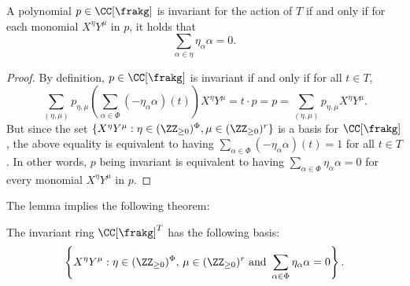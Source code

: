 \begin{lemma}
A polynomial $p \in \CC[\frakg]$ is invariant for the action of $T$ if and only if for each monomial $X^\eta Y^\mu$ in $p$, it holds that
$$\sum_{\alpha\in\eta} \eta_\alpha \alpha = 0.$$
\end{lemma}
\begin{proof}
    By definition, $p \in \CC[\frakg]$ is invariant if and only if for all $t \in T$,
    $$ \sum_{(\eta, \mu)} p_{\eta,\mu} \left(\sum_{\alpha\in\Phi} (- \eta_\alpha \alpha)(t)\right) X^\eta Y^\mu =t\cdot p = p = \sum_{(\eta, \mu)} p_{\eta,\mu} X^\eta Y^\mu.$$
    But since the set $\{X^\eta Y^\mu : \eta \in (\ZZ_{\ge 0})^\Phi, \mu \in (\ZZ_{\ge 0})^r\}$ is a basis for $\CC[\frakg]$, the above equality is equivalent to having 
    $\sum_{\alpha\in\Phi} (- \eta_\alpha \alpha)(t) = 1$ for all $t \in T$. In other words, $p$ being invariant is equivalent to having $\sum_{\alpha\in\Phi} \eta_\alpha \alpha = 0$
    for every monomial $X^\eta Y^\mu$ in $p$.
\end{proof}

The lemma implies the following theorem:

\begin{theorem}\label{invringbasis}
    The invariant ring $\CC[\frakg]^T$ has the following basis:
    $$\left\{ X^\eta Y^\mu :\eta \in (\ZZ_{\ge0})^{\Phi}, \, \mu \in (\ZZ_{\ge0})^r \text{ and }\sum_{\alpha\in\Phi} \eta_\alpha \alpha = 0\right\}.$$
\end{theorem}